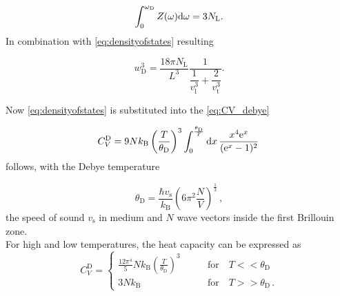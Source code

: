 \begin{equation*}
    \int^{\omega_\text{D}}_0 Z(\omega) \mathrm{d} \omega = 3 N_\text{L}. 
\end{equation*}
In combination with \eqref{eq:densityofstates} resulting

\begin{equation}
    w^{3}_\text{D} = \dfrac{18 \pi N_\text{L}}{L^3}\dfrac{1}{\dfrac{1}{v^{3}_\text{l}} + \dfrac{2}{v^{3}_\text{t} }} .
    \label{eq:Debye_frequency}
\end{equation}


Now \eqref{eq:densityofstates} is substituted into the \eqref{eq:CV_debye}

\begin{equation*}
    C^\text{D}_V = 9 N k_\text{B} \left( \frac{T}{\theta_\text{D}} \right)^3 \int^{\frac{\theta_\text{D}}{T}}_0 \mathrm{d} x \, \frac{x^4 \text{e}^x}{(\text{e}^x -1)^2} \,
\end{equation*}
follows, with the Debye temperature

\begin{equation*}
    \theta_\text{D} = \frac{\hbar v_\text{s}}{k_\text{B}} \left(6 \pi^2 \frac{N}{V}\right)^{\frac{1}{3}} \,,
\end{equation*}
the speed of sound $v_\text{s}$ in medium and $N$ wave vectors inside the first Brillouin zone. \\

For high and low temperatures, the heat capacity can be expressed as
\begin{equation*}
    C^\text{D}_V= \begin{cases}
        \frac{12 \pi^4}{5} N k_\text{B} \left(\frac{T} {\theta_\text{D}}\right)^3 &\qquad \text{for} \quad T << \theta_\text{D} \\ 
        3 N k_\text{B} &\qquad \text{for} \quad T >> \theta_\text{D} \,.
    \end{cases} 
\end{equation*}

\newpage
